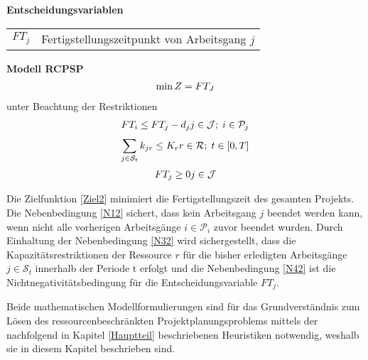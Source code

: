 \documentclass[a4paper,12pt,normalheadings,footexclude,headinclude,liststotoc,nochapterprefix,onecolumn,oneside,parskip,pointlessnumbers]{scrreprt}
\begin{document}
\textbf{Entscheidungsvariablen}
\begin{table}[h!]
    \vspace*{-3mm}
    \hspace*{2mm}
  \renewcommand{\arraystretch}{1,5}
   \begin{tabular}{ll}  %
     $FT_{j}$	& Fertigstellungszeitpunkt von Arbeitsgang $j$\\ 
	\end{tabular}
\end{table}

\textbf{Modell RCPSP}
\begin{eqnarray} \label{Ziel2}
\min Z = FT_{J}\hfill  
\end{eqnarray}
unter Beachtung der Restriktionen
\begin{multline} \label{N12}
FT_{i} \leq FT_{j}-d_{j}
\hfill   j \in \mathcal{J}; \; i \in \mathcal{P}_{j}
\end{multline}\vspace{-3.0ex}
\begin{multline} \label{N32}
\sum_{j\in \mathcal{S}_{t}}k_ {jr} \leq K_{r}
\hfill   r \in \mathcal{R};\; t \in [0,T]
\end{multline}\vspace{-3.0ex}
\begin{multline} \label{N42}
FT_{j} \geq 0
\hfill   j \in \mathcal{J}
\end{multline}\vspace{-3.0ex}

Die Zielfunktion \eqref{Ziel2} minimiert die Fertigstellungszeit des gesamten Projekts. Die Nebenbedingung \eqref{N12} sichert, dass kein Arbeitsgang $j$ beendet werden kann, wenn nicht alle vorherigen Arbeitsgänge $i \in \mathcal{P}_{i}$ zuvor beendet wurden. Durch Einhaltung der Nebenbedingung \eqref{N32} wird sichergestellt, dass die Kapazitätsrestriktionen der Ressource $r$ für die bisher erledigten Arbeitsgänge $j \in \mathcal{S}_{t}$ innerhalb der Periode {t} erfolgt und die Nebenbedingung \eqref{N42} ist die Nichtnegativitätsbedingung für die Entscheidungsvariable $FT_{j}$.

Beide mathematischen Modellformulierungen sind für das Grundverständnis zum Lösen des ressourcenbeschränkten Projektplanungsproblems mittels der nachfolgend in Kapitel \ref{Hauptteil} beschriebenen Heuristiken notwendig, weshalb sie in diesem Kapitel beschrieben sind.
\end{document}

